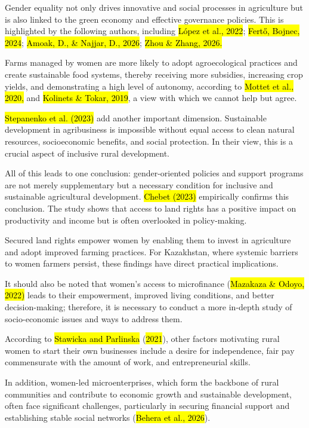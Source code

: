 Gender equality not only drives innovative and social processes in
agriculture but is also linked to the green economy and effective
governance policies. This is highlighted by the following authors,
including \hl{López et al., 2022}; \hl{Fertő, Bojnec, 2024}; \hl{Amoak,
D., \& Najjar, D., 2026}; \hl{Zhou \& Zhang, 2026.}

Farms managed by women are more likely to adopt agroecological practices
and create sustainable food systems, thereby receiving more subsidies,
increasing crop yields, and demonstrating a high level of autonomy,
according to \hl{Mottet et al., 2020,} and \hl{Kolinets \& Tokar, 2019},
a view with which we cannot help but agree.

\hl{Stepanenko et al. (2023)} add another important dimension.
Sustainable development in agribusiness is impossible without equal
access to clean natural resources, socioeconomic benefits, and social
protection. In their view, this is a crucial aspect of inclusive rural
development.

All of this leads to one conclusion: gender-oriented policies and
support programs are not merely supplementary but a necessary condition
for inclusive and sustainable agricultural development. \hl{Chebet
(2023)} empirically confirms this conclusion. The study shows that
access to land rights has a positive impact on productivity and income
but is often overlooked in policy-making.

Secured land rights empower women by enabling them to invest in
agriculture and adopt improved farming practices. For Kazakhstan, where
systemic barriers to women farmers persist, these findings have direct
practical implications.

It should also be noted that women's access to microfinance
(\hl{Mazakaza \& Odoyo, 2022)} leads to their empowerment, improved
living conditions, and better decision-making; therefore, it is
necessary to conduct a more in-depth study of socio-economic issues and
ways to address them.

According to \hl{Stawicka and Parlinska} (\hl{2021}), other factors
motivating rural women to start their own businesses include a desire
for independence, fair pay commensurate with the amount of work, and
entrepreneurial skills.

In addition, women-led microenterprises, which form the backbone of
rural communities and contribute to economic growth and sustainable
development, often face significant challenges, particularly in securing
financial support and establishing stable social networks (\hl{Behera et
al., 2026}).


